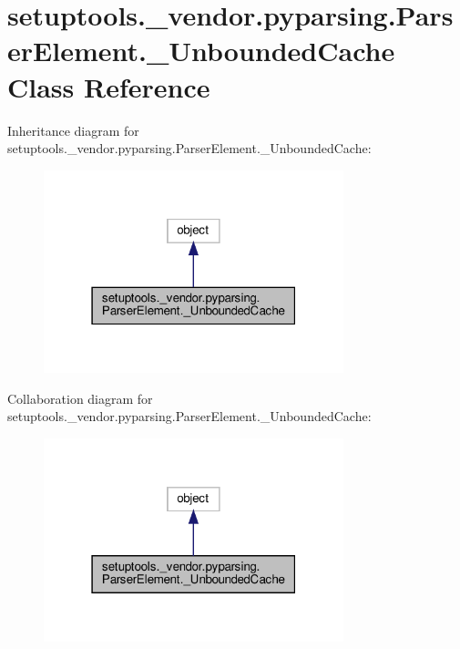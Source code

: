\hypertarget{classsetuptools_1_1__vendor_1_1pyparsing_1_1ParserElement_1_1__UnboundedCache}{}\section{setuptools.\+\_\+vendor.\+pyparsing.\+Parser\+Element.\+\_\+\+Unbounded\+Cache Class Reference}
\label{classsetuptools_1_1__vendor_1_1pyparsing_1_1ParserElement_1_1__UnboundedCache}


Inheritance diagram for setuptools.\+\_\+vendor.\+pyparsing.\+Parser\+Element.\+\_\+\+Unbounded\+Cache\+:
\nopagebreak
\begin{figure}[H]
\begin{center}
\leavevmode
\includegraphics[width=247pt]{classsetuptools_1_1__vendor_1_1pyparsing_1_1ParserElement_1_1__UnboundedCache__inherit__graph}
\end{center}
\end{figure}


Collaboration diagram for setuptools.\+\_\+vendor.\+pyparsing.\+Parser\+Element.\+\_\+\+Unbounded\+Cache\+:
\nopagebreak
\begin{figure}[H]
\begin{center}
\leavevmode
\includegraphics[width=247pt]{classsetuptools_1_1__vendor_1_1pyparsing_1_1ParserElement_1_1__UnboundedCache__coll__graph}
\end{center}
\end{figure}
